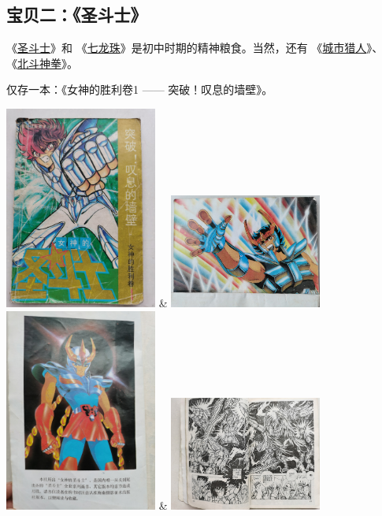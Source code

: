 \endgroup


\subsection{宝贝二：《圣斗士》}

《\href{https://baike.baidu.com/item/圣斗士/226570}{圣斗士}》和
《\href{https://baike.baidu.com/item/龙珠/545064}{七龙珠}》是初中时期的精神粮食。当然，还有
《\href{https://baike.baidu.com/item/城市猎人/10904}{城市猎人}》、
《\href{https://baike.baidu.com/item/北斗神拳/1014286}{北斗神拳}》。

仅存一本：《女神的胜利卷1 —— 突破！叹息的墙壁》。

\begingroup
  \centering
  \begin{tblr}{}
    \includegraphics[width=5cm]{pic/圣斗士-1.jpg}
      & \includegraphics[width=5cm]{pic/圣斗士-2.jpg} \\
    \includegraphics[width=5cm]{pic/圣斗士-3.jpg}
      & \includegraphics[width=5cm]{pic/圣斗士-4.jpg}
  \end{tblr}

